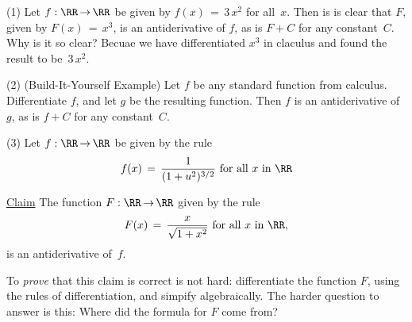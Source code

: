 {\hspace*{\parindent}(1) Let $f:{\RR} \,{\rightarrow}\, {\RR}$ be given by $f(x) \,=\, 3\,x^{2}$ for all~$x$.
    Then is is clear that $F$, given by $F(x) \,=\, x^{3}$, is an antiderivative of $f$, as is $F+C$ for any constant~$C$.
    Why is it so clear? Becuae we have differentiated $x^{3}$ in claculus and found the result to be~$3\,x^{2}$.

\V

        (2) (Build-It-Yourself Example) Let $f$ be any standard function from calculus. Differentiate $f$, and let $g$ be the resulting function.
    Then $f$ is an antiderivative of $g$, as is $f+C$ for any constant~$C$.

\V

        (3) Let $f:{\RR} \,{\rightarrow}\, {\RR}$ be given by the rule
        \begin{displaymath}
        f(x) \,=\, \frac{1}{(1+u^{2})^{3/2}} \mbox{ for all $x$ in ${\RR}$}
        \end{displaymath}


        \underline{Claim} The function $F:{\RR} \,{\rightarrow}\, {\RR}$ given by the rule
        \begin{displaymath}
        F(x) \,=\, \frac{x}{\sqrt{1+x^{2}}} \mbox{ for all $x$ in~${\RR}$},
        \end{displaymath}
    is an antiderivative of~$f$.

        To {\em prove} that this claim is correct is not hard: differentiate the function $F$, using the rules of differentiation, and simpify algebraically.
    The harder question to answer is this: Where did the formula for $F$ come from?

\VV

}
